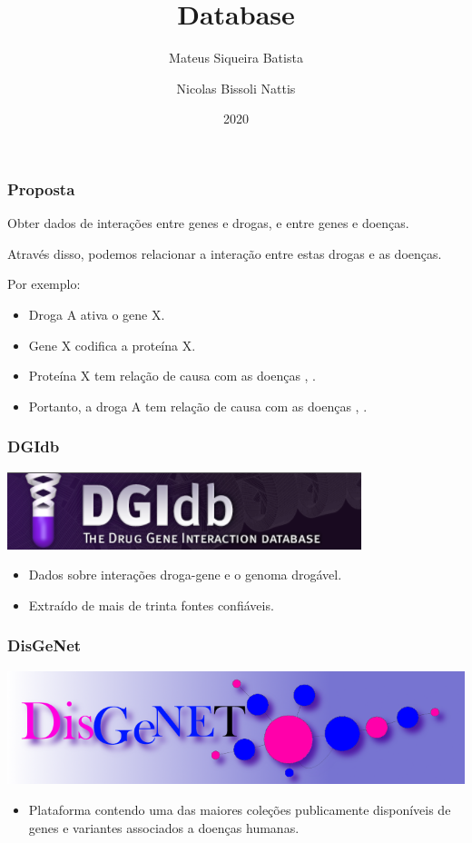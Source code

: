 \documentclass[12pt]{beamer}
\title[Database]{Database}
\author{
  Mateus Siqueira Batista\and
  Nicolas Bissoli Nattis
}
\institute{
  MC536 - Instituto de Computação, UNICAMP
}
\date[2020]{2020}
\begin{document}
\frame{\titlepage}

\begin{frame}
  \frametitle{Proposta}
  Obter dados de interações entre genes e drogas, e entre genes e doenças.
  \pause

  Através disso, podemos relacionar a interação entre estas drogas e as doenças.
  \pause
  
  Por exemplo:
  \begin{itemize}
    \item Droga A ativa o gene X.
    \item Gene X codifica a proteína X.
    \item Proteína X tem relação de causa com as doenças \textalpha, \textgamma.
    \item Portanto, a droga A tem relação de causa com as doenças \textalpha, \textgamma.
  \end{itemize}
\end{frame}

\begin{frame}
  \frametitle{DGIdb}
  \includegraphics[scale=0.8]{dgi.png}
  \begin{itemize}
    \item {Dados sobre interações droga-gene e o genoma drogável.}
    \item {Extraído de mais de trinta fontes confiáveis.}
  \end{itemize}
\end{frame} 

\begin{frame}
  \frametitle{DisGeNet}
  \includegraphics[scale=0.425]{disgenet.png}
  \begin{itemize}
    \item {Plataforma contendo uma das maiores coleções publicamente disponíveis de genes e variantes associados a doenças humanas.}
  \end{itemize}
\end{frame} 
\end{document}

